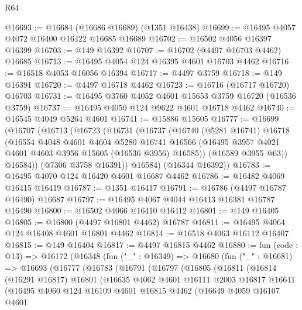 \begin{lexlean}{R64}
\begin{coremodule}
@16693 := @16684 (@16686 @16689) (@1351 @16438)
@16699 := @16495 @4057 @4072 @16400 @16422 @16685 @16689
@16702 := @16502 @4056 @16397 @16399
@16703 := @149 @16392
@16707 := @16702 (@4497 @16703 @4462) @16685
@16713 := @16495 @4054 @124 @16395 @4601 @16703 @4462
@16716 := @16518 @4053 @16056 @16394
@16717 := @4497 @3759
@16718 := @149 @16391
@16720 := @4497 @16718 @4462
@16723 := @16716 (@16717 @16720) @16703
@16731 := @16495 @3760 @4052 @4601 @15653 @3759 @16720 (@16536 @3759)
@16737 := @16495 @4050 @124 @9622 @4601 @16718 @4462
@16740 := @16545 @4049 @5264 @4601
@16741 := @15886 @15605
@16777 := @16699
    (@16707
      (@16713
        (@16723
          (@16731
            (@16737
              (@16740
                (@5281 @16741)
                @16718
                (@16554
                  @4048
                  @4601
                  @4604
                  @5280
                  @16741
                  @16566
                  (@16495 @3957 @4021 @4601 @4603 @3956 @15605 (@16536 @3956) @16585))
                (@16589 @3955 @63))
              @16584))
          (@7306 @3758 @16391))
        @16584)
      (@16344 @16392))
@16783 := @16495 @4070 @124 @16420 @4601 @16687 @4462
@16786 := @16482 @4069 @16415 @16419
@16787 := @1351 @16417
@16791 := @16786 (@4497 @16787 @16490) @16687
@16797 := @16495 @4067 @4044 @16413 @16381 @16787 @16490
@16800 := @16502 @4066 @16410 @16412
@16801 := @149 @16405
@16805 := @16800 (@4497 @16801 @4462) @16787
@16811 := @16495 @4064 @124 @16408 @4601 @16801 @4462
@16814 := @16518 @4063 @16112 @16407
@16815 := @149 @16404
@16817 := @4497 @16815 @4462
@16880 := fun (code : @13) =>
  @16172
    (@16348
      (fun ("_" : @16349) =>
      @16680
        (fun ("_" : @16681) =>
        @16693
          (@16777
            (@16783
              (@16791
                (@16797
                  (@16805
                    (@16811
                      (@16814
                        (@16291 @16817)
                        @16801
                        (@16635
                          @4062
                          @4601
                          @16111
                          @2003
                          @16817
                          @16641
                          (@16495
                            @4060
                            @124
                            @16109
                            @4601
                            @16815
                            @4462
                            (@16649
                              @4059
                              @16107
                              @4601

\end{coremodule}
\end{lexlean}
